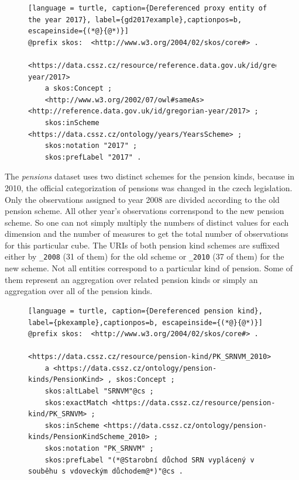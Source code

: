 \begin{figure}[h]
\begin{lstlisting}[language = turtle, caption={Dereferenced proxy entity of the year 2017}, label={gd2017example},captionpos=b, escapeinside={(*@}{@*)}]
@prefix skos:  <http://www.w3.org/2004/02/skos/core#> .

<https://data.cssz.cz/resource/reference.data.gov.uk/id/gregorian-year/2017>
    a skos:Concept ;
    <http://www.w3.org/2002/07/owl#sameAs> <http://reference.data.gov.uk/id/gregorian-year/2017> ;
    skos:inScheme <https://data.cssz.cz/ontology/years/YearsScheme> ;
    skos:notation "2017" ;
    skos:prefLabel "2017" .
\end{lstlisting}
\end{figure}

The \textit{pensions} dataset uses two distinct schemes for the pension kinds, because in 2010, the official categorization of pensions was changed in the czech legislation. Only the observations assigned to year 2008 are divided according to the old pension scheme. All other year's observations correnspond to the new pension scheme. So one can not simply multiply the numbers of distinct values for each dimension and the number of measures to get the total number of observations for this particular cube. The URIs of both pension kind schemes are suffixed either by \verb|_2008| (31 of them) for the old scheme or \verb|_2010| (37 of them) for the new scheme. Not all entities correspond to a particular kind of pension. Some of them represent an aggregation over related pension kinds or simply an aggregation over all of the pension kinds.

\begin{figure}[h]
\begin{lstlisting}[language = turtle, caption={Dereferenced pension kind}, label={pkexample},captionpos=b, escapeinside={(*@}{@*)}]
@prefix skos:  <http://www.w3.org/2004/02/skos/core#> .

<https://data.cssz.cz/resource/pension-kind/PK_SRNVM_2010>
    a <https://data.cssz.cz/ontology/pension-kinds/PensionKind> , skos:Concept ;
    skos:altLabel "SRNVM"@cs ;
    skos:exactMatch <https://data.cssz.cz/resource/pension-kind/PK_SRNVM> ;
    skos:inScheme <https://data.cssz.cz/ontology/pension-kinds/PensionKindScheme_2010> ;
    skos:notation "PK_SRNVM" ;
    skos:prefLabel "(*@Starobní důchod SRN vyplácený v souběhu s vdoveckým důchodem@*)"@cs .
\end{lstlisting}
\end{figure}

